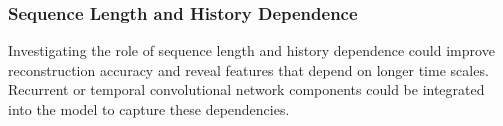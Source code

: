 \subsubsection{Sequence Length and History Dependence}
Investigating the role of sequence length and history dependence could improve reconstruction accuracy and reveal features that depend on longer time scales. Recurrent or temporal convolutional network components could be integrated into the model to capture these dependencies.
